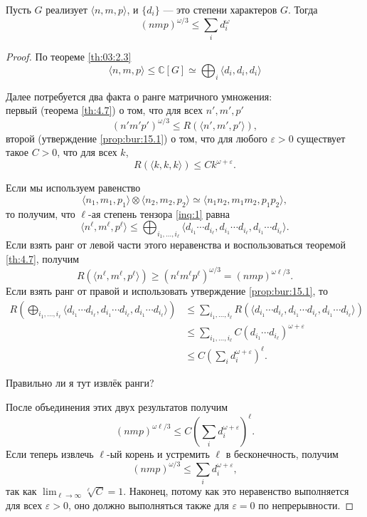 \begin{theorem}\label{th:05:1.8}
  Пусть $G$ реализует $\langle n, m, p \rangle$, и $\{ d_i \}$ --- это степени характеров $G$. Тогда
  \[
  	(nmp)^{\omega/3} \leq \sum\limits_i d_i^\omega
  \]
\end{theorem}
\begin{proof}
	По теореме \ref{th:03:2.3}
	\begin{equation}
	  \langle n,m,p \rangle \leq \mathbb{C}[G] \simeq \bigoplus_i \langle d_i, d_i, d_i \rangle \label{inq:1}
	\end{equation}

	Далее потребуется два факта о ранге матричного умножения:\\
	первый (теорема \ref{th:4.7}) о том, что для всех $n',m',p'$
	\[
		(n'm'p')^{\omega/3} \leq R(\langle n',m',p' \rangle),
	\]
	второй (утверждение \ref{prop:bur:15.1}) о том, что для любого $\varepsilon > 0$ существует такое $C > 0$, что для всех $k$,
	\[
		R(\langle k,k,k \rangle) \leq C k ^{\omega+\varepsilon}.
	\]

	Если мы используем равенство
	\[
		\langle n_1, m_1, p_1 \rangle \otimes \langle n_2, m_2, p_2 \rangle \simeq \langle n_1n_2, m_1m_2, p_1p_2 \rangle,
	\]
	то получим, что $\ell$-ая степень тензора \eqref{inq:1} равна
	\[
		\langle n^\ell , m^\ell , p^\ell  \rangle \leq \bigoplus_{i_1, \dotsc, i_\ell } \langle d_{i_1} \dotsm d_{i_\ell }, d_{i_1} \dotsm d_{i_\ell }, d_{i_1} \dotsm d_{i_\ell } \rangle.
	\]
	Если взять ранг от левой части этого неравенства и воспользоваться теоремой \ref{th:4.7}, получим
	\[
		R(\langle n^\ell , m^\ell , p^\ell  \rangle) \geq (n^\ell m^\ell p^\ell )^{\omega/3} = (nmp)^{\omega \ell / 3}.
	\]
	Если взять ранг от правой и использовать утверждение \ref{prop:bur:15.1}, то 
	\begin{align*}
	     R(\bigoplus_{i_1, \dotsc, i_\ell } \langle  d_{i_1} \dotsm d_{i_\ell }, d_{i_1} \dotsm d_{i_\ell }, d_{i_1} \dotsm d_{i_\ell } \rangle) & \leq 
			\sum\limits_{i_1, \dotsc, i_\ell } R(\langle d_{i_1} \dotsm d_{i_\ell }, d_{i_1} \dotsm d_{i_\ell }, d_{i_1} \dotsm d_{i_\ell } \rangle) \\
			& \leq 	\sum\limits_{i_1, \dotsc, i_\ell } C (d_{i_1} \dotsm d_{i_\ell })^{\omega + \varepsilon} \\
			& \leq C \left( \sum\limits_i d_i^{\omega + \varepsilon} \right)^\ell.
	\end{align*}
	\begin{question}
	  Правильно ли я тут извлёк ранги?
	\end{question}
	После объединения этих двух результатов получим
	\[
		(nmp)^{\omega \ell /3} \leq C \left( \sum\limits_i d_i^{\omega + \varepsilon} \right)^\ell .
	\]
	Если теперь извлечь $\ell$-ый корень и устремить $\ell$ в бесконечность, получим
	\[
		(nmp)^{\omega/3} \leq \sum\limits_i d_i^{\omega + \varepsilon},
	\]
	так как $\lim_{\ell \to \infty} \sqrt[\ell]{C} = 1$. Наконец, потому как это неравенство выполняется для всех $\varepsilon > 0$, оно должно выполняться также для $\varepsilon = 0$ по непрерывности.
\end{proof}

